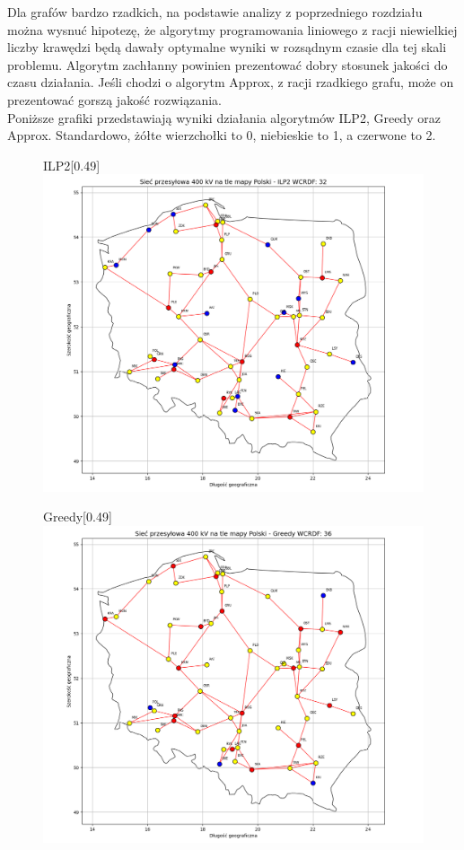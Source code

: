 Dla grafów bardzo rzadkich, na podstawie analizy z poprzedniego rozdziału można wysnuć hipotezę, że algorytmy programowania liniowego z racji niewielkiej liczby krawędzi będą dawały optymalne wyniki w rozsądnym czasie dla tej skali problemu. Algorytm zachłanny powinien prezentować dobry stosunek jakości do czasu działania. Jeśli chodzi o algorytm Approx, z racji rzadkiego grafu, może on prezentować gorszą jakość rozwiązania.\\

Poniższe grafiki przedstawiają wyniki działania algorytmów ILP2, Greedy oraz Approx. Standardowo, żółte wierzchołki to 0, niebieskie to 1, a czerwone to 2.

\begin{figure}[htbp]
    \centering
    \begin{subcaptionbox}{ILP2\label{fig:img}}[0.49\linewidth]
        {\includegraphics[width=\linewidth]{assets/Poland/img.png}}
    \end{subcaptionbox}
    \hfill
    \begin{subcaptionbox}{Greedy\label{fig:img2}}[0.49\linewidth]
        {\includegraphics[width=\linewidth]{assets/Poland/img_2.png}}

\end{subcaptionbox}
\end{figure}
